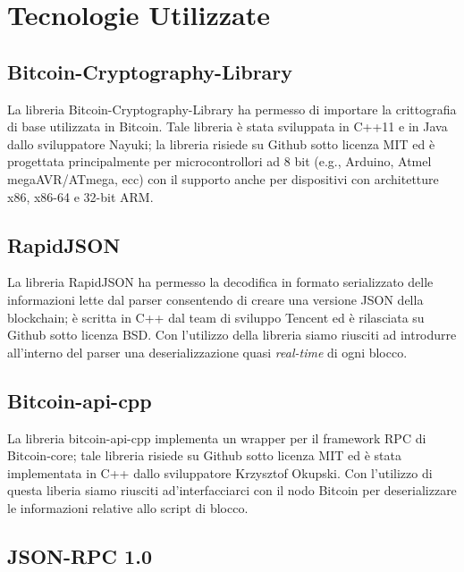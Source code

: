 \chapter{Tecnologie Utilizzate}\label{chap:tecnologieUtilizzate}

\section{Bitcoin-Cryptography-Library} \label{sec:cryptographyBitcoinLib}

La libreria Bitcoin-Cryptography-Library \cite{Bitcoin-Cryptography-Library:github} ha permesso di importare la crittografia di base utilizzata in Bitcoin. Tale  libreria è stata sviluppata in C++11 e in Java dallo sviluppatore Nayuki; la libreria risiede su Github sotto licenza MIT ed è progettata principalmente per microcontrollori ad 8 bit (e.g., Arduino, Atmel megaAVR/ATmega, ecc) con il supporto anche per dispositivi con architetture x86, x86-64 e 32-bit ARM.

\section{RapidJSON} \label{sec:rapidjsonLib}

La libreria RapidJSON \cite{rapidjson:github} ha permesso la decodifica in formato serializzato delle informazioni lette dal parser consentendo di creare una versione JSON della blockchain; è scritta in C++ dal team di sviluppo Tencent ed è rilasciata su Github sotto licenza BSD.
Con l’utilizzo della libreria siamo riusciti ad introdurre all’interno del parser una deserializzazione quasi \emph{real-time} di ogni blocco.


\section{Bitcoin-api-cpp} \label{sec:bitcoinApiLib}

La libreria bitcoin-api-cpp \cite{bitcoin-api-cpp:github} implementa un wrapper per il framework RPC di Bitcoin-core; tale libreria risiede su Github sotto licenza MIT ed è stata  implementata in C++ dallo sviluppatore Krzysztof Okupski.
Con l'utilizzo di questa liberia siamo riusciti ad'interfacciarci con il nodo Bitcoin per deserializzare le informazioni relative allo script di blocco.

\section{JSON-RPC 1.0} \label{sec:jsonrpchttp}

